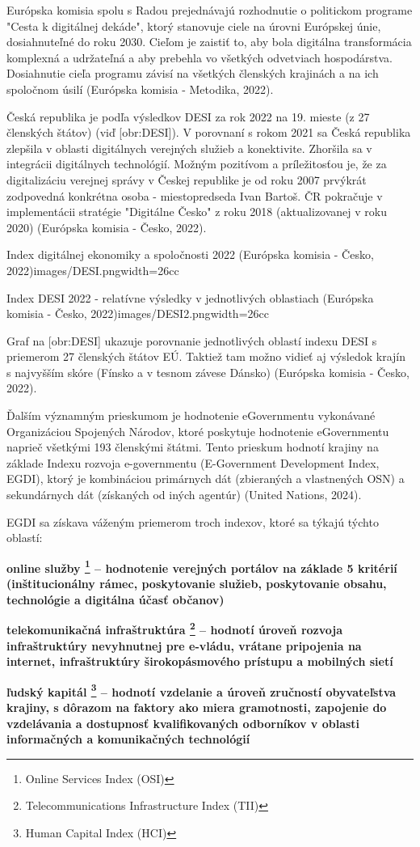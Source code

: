 Európska komisia spolu s Radou prejednávajú rozhodnutie o politickom programe "Cesta k digitálnej dekáde", ktorý stanovuje ciele na úrovni Európskej únie, dosiahnuteľné do roku 2030. Cieľom je zaistiť to, aby bola digitálna transformácia komplexná a udržateľná a aby prebehla vo všetkých odvetviach hospodárstva. Dosiahnutie cieľa programu závisí na všetkých členských krajinách a na ich spoločnom úsilí \scr(Európska komisia - Metodika, 2022).

Česká republika je podľa výsledkov DESI za rok 2022 na 19. mieste (z 27 členských štátov) (viď [obr:DESI]). V porovnaní s rokom 2021 sa Česká republika zlepšila v oblasti digitálnych verejných služieb a konektivite. Zhoršila sa v integrácii digitálnych technológií. Možným pozitívom a príležitosťou je, že za digitalizáciu verejnej správy v Českej republike je od roku 2007 prvýkrát zodpovedná konkrétna osoba - miestopredseda Ivan Bartoš. ČR pokračuje v implementácii stratégie "Digitálne Česko" z roku 2018 (aktualizovanej v roku 2020) \scr(Európska komisia - Česko, 2022).

{Index digitálnej ekonomiky a spoločnosti 2022 (Európska komisia - Česko, 2022)}{images/DESI.png}{width=26cc}

{Index DESI 2022 - relatívne výsledky v jednotlivých oblastiach (Európska komisia - Česko, 2022)}{images/DESI2.png}{width=26cc}

Graf na [obr:DESI] ukazuje porovnanie jednotlivých oblastí indexu DESI s priemerom 27 členských štátov EÚ. Taktiež tam možno vidieť aj výsledok krajín s najvyšším skóre (Fínsko a v tesnom závese Dánsko) \scr(Európska komisia - Česko, 2022).

Ďalším významným prieskumom je hodnotenie eGovernmentu vykonávané Organizáciou Spojených Národov, ktoré poskytuje hodnotenie eGovernmentu  naprieč všetkými 193 členskými štátmi. Tento prieskum hodnotí krajiny na základe Indexu rozvoja e-governmentu (E-Government Development Index, EGDI), ktorý je kombináciou primárnych dát (zbieraných a vlastnených OSN) a sekundárnych dát (získaných od iných agentúr) \scr(United Nations, 2024).

EGDI sa získava váženým priemerom troch indexov, ktoré sa týkajú týchto oblastí:

\startitemize
\item{\start\bf online služby \stop \footnote{Online Services Index (OSI)} -- hodnotenie verejných portálov na základe 5 kritérií (inštitucionálny rámec, poskytovanie služieb, poskytovanie obsahu, technológie a digitálna účasť občanov)}
\item{\start\bf telekomunikačná infraštruktúra  \stop \footnote{Telecommunications Infrastructure Index (TII)} -- hodnotí úroveň rozvoja infraštruktúry nevyhnutnej pre e-vládu, vrátane pripojenia na internet, infraštruktúry širokopásmového prístupu a mobilných sietí}
\item{\start\bf ľudský kapitál \stop \footnote{Human Capital Index (HCI)} -- hodnotí vzdelanie a úroveň zručností obyvateľstva krajiny, s dôrazom na faktory ako miera gramotnosti, zapojenie do vzdelávania a dostupnosť kvalifikovaných odborníkov v oblasti informačných a komunikačných technológií}
\stopitemize 

